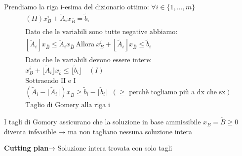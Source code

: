 Prendiamo la riga i-esima del dizionario ottimo: $\forall i \in\{1, \ldots, m\}$
\[
\begin{array}{c}
    (II) x_B^i+\tilde{A}_i x_{\bar{B}}=\tilde{b}_i \\ \\ \text{Dato che le variabili sono tutte negative abbiamo:}\\\left\lfloor \tilde{A}_i\right\rfloor x_{\bar{B}} \leqslant \tilde{A}_i x_{\bar{B}} \ \text{Allora}\ x_B^i+\left\lfloor\tilde{A}_i\right\rfloor x_{\bar{B}} \leqslant \tilde{b}_i \\  \\ \text{Dato che le variabili devono essere intere:}\\x_B^i+\lfloor\tilde{A}_i \rfloor x_{\bar{b}} \leqslant\lfloor\tilde{b}_i\rfloor \quad (I) \\ \text{Sottraendo II e I}\\ (\tilde{A}_i-\lfloor\tilde{A}_i\rfloor) x_{\bar{B}} \geqslant \tilde{b}_i-\lfloor\tilde{b}_i\rfloor \ \ (\geq\text{ perchè togliamo più a dx che sx})\\ \text{Taglio di Gomery alla riga i}
\end{array}
\]

I tagli di Gomory assicurano che la soluzione in base ammissibile $x_B=\tilde{B}\geqslant0$ 
diventa infeasible → ma non tagliano nessuna soluzione intera

\textbf{Cutting plan}→ Soluzione intera trovata con solo tagli


